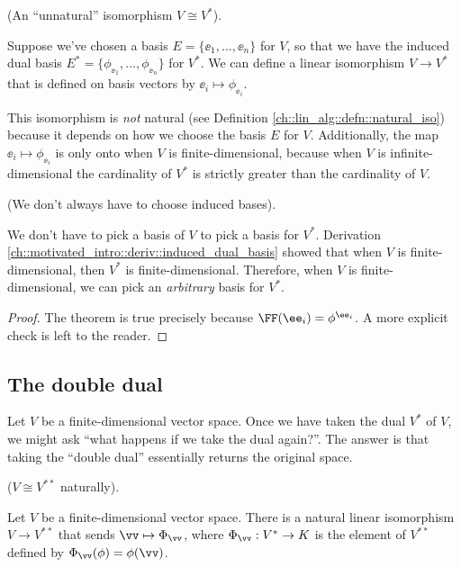 \begin{remark}
\label{ch::motivated_intro::rmk::unnatural_iso_V_V*}
    (An ``unnatural'' isomorphism $V \cong V^*$).
    
    Suppose we've chosen a basis $E = \{\ee_1, ..., \ee_n\}$ for $V$, so that we have the induced dual basis ${E^* = \{\phi_{\ee_1}, ..., \phi_{\ee_n}\}}$ for $V^*$. We can define a linear isomorphism $V \rightarrow V^*$ that is defined on basis vectors by $\ee_i \mapsto \phi_{\ee_i}$.
    
    This isomorphism is \textit{not} natural (see Definition \ref{ch::lin_alg::defn::natural_iso}) because it depends on how we choose the basis $E$ for $V$. Additionally, the map $\ee_i \mapsto \phi_{\ee_i}$ is only onto when $V$ is finite-dimensional, because when $V$ is infinite-dimensional the cardinality of $V^*$ is strictly greater than the cardinality of $V$.    
\end{remark}

\begin{remark}
    (We don't always have to choose induced bases).
    
    We don't have to pick a basis of $V$ to pick a basis for $V^*$. Derivation \ref{ch::motivated_intro::deriv::induced_dual_basis} showed that when $V$ is finite-dimensional, then $V^*$ is finite-dimensional. Therefore, when $V$ is finite-dimensional, we can pick an \textit{arbitrary} basis for $V^*$.
\end{remark}

\begin{proof}
    The theorem is true precisely because $\FF(\ee_i) = \phi^{\ee_i}$. A more explicit check is left to the reader.
\end{proof}

\subsection*{The double dual}

Let $V$ be a finite-dimensional vector space. Once we have taken the dual $V^*$ of $V$, we might ask ``what happens if we take the dual again?''. The answer is that taking the ``double dual'' essentially returns the original space.


\begin{theorem}
\label{ch::motivated_intro::thm::V_iso_double_dual}
    ($V \cong V^{**}$ naturally). 
    
    Let $V$ be a finite-dimensional vector space. There is a natural linear isomorphism $V \rightarrow V^{**}$ that sends $\vv \mapsto \Phi_\vv$, where $\Phi_\vv:V^* \rightarrow K$ is the element of $V^{**}$ defined by $\Phi_\vv(\phi) = \phi(\vv)$.
\end{theorem}

